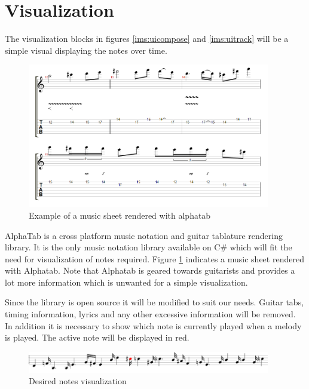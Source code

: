  
\section{Visualization}
The visualization blocks in figures \ref{ims:uicompose} and \ref{ims:uitrack} will be a simple visual displaying the notes over time. 


\begin{figure}
\centerline{\includegraphics[width=400px]{../images/alphatab_example.png}}
\caption{Example of a music sheet rendered with alphatab}
\label{ims:alphatab}
\end{figure}

AlphaTab is a cross platform music notation and guitar tablature rendering library. It is the only music notation library available on C\# which will fit the need for visualization of notes required.
Figure \ref{ims:alphatab} indicates a music sheet rendered with Alphatab. Note that Alphatab is geared towards guitarists and provides a lot more information which is unwanted for a simple visualization. 

Since the library is open source it will be modified to suit our needs. Guitar tabs, timing information, lyrics and any other excessive information will be removed. In addition it is necessary to show which note is currently played when a melody is played. The active note will be displayed in red.

\begin{figure}
\centerline{\includegraphics[width=400px]{../images/music_sheet_visualization.png}}
\caption{Desired notes visualization}
\label{ims:uiharrynotesvisualization}
\end{figure}

